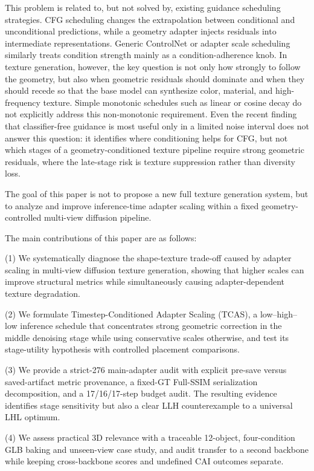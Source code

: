 \documentclass[times,twocolumn,final]{elsarticle}
\begin{document}
This problem is related to, but not solved by, existing guidance scheduling strategies. CFG scheduling changes the extrapolation between conditional and unconditional predictions, while a geometry adapter injects residuals into intermediate representations. Generic ControlNet or adapter scale scheduling similarly treats condition strength mainly as a condition-adherence knob. In texture generation, however, the key question is not only how strongly to follow the geometry, but also when geometric residuals should dominate and when they should recede so that the base model can synthesize color, material, and high-frequency texture. Simple monotonic schedules such as linear or cosine decay do not explicitly address this non-monotonic requirement. Even the recent finding that classifier-free guidance is most useful only in a limited noise interval \cite{kynkanniemi2024limited} does not answer this question: it identifies where conditioning helps for CFG, but not which stages of a geometry-conditioned texture pipeline require strong geometric residuals, where the late-stage risk is texture suppression rather than diversity loss.

The goal of this paper is not to propose a new full texture generation system, but to analyze and improve inference-time adapter scaling within a fixed geometry-controlled multi-view diffusion pipeline.

The main contributions of this paper are as follows:

(1) We systematically diagnose the shape-texture trade-off caused by adapter scaling in multi-view diffusion texture generation, showing that higher scales can improve structural metrics while simultaneously causing adapter-dependent texture degradation.

(2) We formulate Timestep-Conditioned Adapter Scaling (TCAS), a low--high--low inference schedule that concentrates strong geometric correction in the middle denoising stage while using conservative scales otherwise, and test its stage-utility hypothesis with controlled placement comparisons.

(3) We provide a strict-276 main-adapter audit with explicit pre-save versus saved-artifact metric provenance, a fixed-GT Full-SSIM serialization decomposition, and a 17/16/17-step budget audit. The resulting evidence identifies stage sensitivity but also a clear LLH counterexample to a universal LHL optimum.

(4) We assess practical 3D relevance with a traceable 12-object, four-condition GLB baking and unseen-view case study, and audit transfer to a second backbone while keeping cross-backbone scores and undefined CAI outcomes separate.
\end{document}
